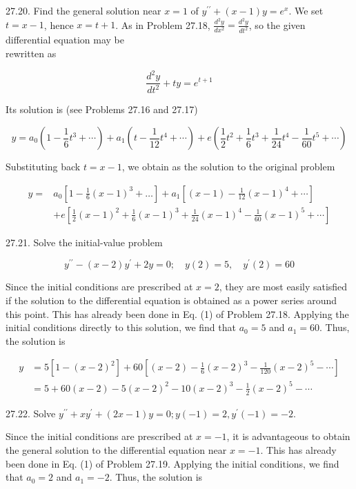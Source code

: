\documentclass[10pt]{article}
\begin{document}
27.20. Find the general solution near $x=1$ of $y^{\prime \prime}+(x-1) y=e^{x}$. We set $t=x-1$, hence $x=t+1$. As in Problem 27.18, $\frac{d^{2} y}{d x^{2}}=\frac{d^{2} y}{d t^{2}}$, so the given differential equation may be\\
rewritten as

$$
\frac{d^{2} y}{d t^{2}}+t y=e^{t+1}
$$

Its solution is (see Problems 27.16 and 27.17)

$$
y=a_{0}\left(1-\frac{1}{6} t^{3}+\cdots\right)+a_{1}\left(t-\frac{1}{12} t^{4}+\cdots\right)+e\left(\frac{1}{2} t^{2}+\frac{1}{6} t^{3}+\frac{1}{24} t^{4}-\frac{1}{60} t^{5}+\cdots\right)
$$

Substituting back $t=x-1$, we obtain as the solution to the original problem

$$
\begin{aligned}
y= & a_{0}\left[1-\frac{1}{6}(x-1)^{3}+\ldots\right]+a_{1}\left[(x-1)-\frac{1}{12}(x-1)^{4}+\cdots\right] \\
& +e\left[\frac{1}{2}(x-1)^{2}+\frac{1}{6}(x-1)^{3}+\frac{1}{24}(x-1)^{4}-\frac{1}{60}(x-1)^{5}+\cdots\right]
\end{aligned}
$$

27.21. Solve the initial-value problem

$$
y^{\prime \prime}-(x-2) y^{\prime}+2 y=0 ; \quad y(2)=5, \quad y^{\prime}(2)=60
$$

Since the initial conditions are prescribed at $x=2$, they are most easily satisfied if the solution to the differential equation is obtained as a power series around this point. This has already been done in Eq. (1) of Problem 27.18. Applying the initial conditions directly to this solution, we find that $a_{0}=5$ and $a_{1}=60$. Thus, the solution is

$$
\begin{aligned}
y & =5\left[1-(x-2)^{2}\right]+60\left[(x-2)-\frac{1}{6}(x-2)^{3}-\frac{1}{120}(x-2)^{5}-\cdots\right] \\
& =5+60(x-2)-5(x-2)^{2}-10(x-2)^{3}-\frac{1}{2}(x-2)^{5}-\cdots
\end{aligned}
$$

27.22. Solve $y^{\prime \prime}+x y^{\prime}+(2 x-1) y=0 ; y(-1)=2, y^{\prime}(-1)=-2$.

Since the initial conditions are prescribed at $x=-1$, it is advantageous to obtain the general solution to the differential equation near $x=-1$. This has already been done in Eq. (1) of Problem 27.19. Applying the initial conditions, we find that $a_{0}=2$ and $a_{1}=-2$. Thus, the solution is
\end{document}
